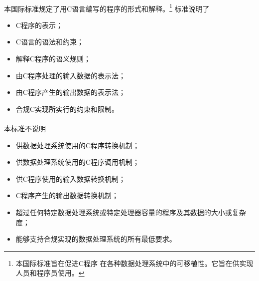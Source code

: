 
\paragraph{}
本国际标准规定了用C语言编写的程序的形式和解释。\footnote{本国际标准旨在促进C程序
在各种数据处理系统中的可移植性。它旨在供实现人员和程序员使用。} 标准说明了
\begin{itemize}
  \item{C程序的表示；}
  \item{C语言的语法和约束；}
  \item{解释C程序的语义规则；}
  \item{由C程序处理的输入数据的表示法；}
  \item{由C程序产生的输出数据的表示法；}
  \item{合规C实现所实行的约束和限制。}
\end{itemize}

\paragraph{}
本标准不说明
\begin{itemize}
  \item{供数据处理系统使用的C程序转换机制；}
  \item{供数据处理系统使用的C程序调用机制；}
  \item{供C程序使用的输入数据转换机制；}
  \item{C程序产生的输出数据转换机制；}
  \item{超过任何特定数据处理系统或特定处理器容量的程序及其数据的大小或复杂度；}
  \item{能够支持合规实现的数据处理系统的所有最低要求。}
\end{itemize}
